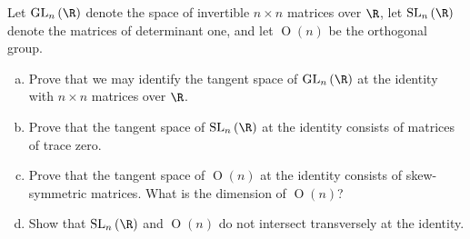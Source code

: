 \documentclass[10pt]{mypackage}
\begin{document}
\begin{problem}[Problem 2]
  Let $ \operatorname{GL}_n\left( \R \right) $ denote the space of invertible $n\times n$ matrices over $\R$, let $\operatorname{SL}_n\left( \R \right)$ denote the matrices of determinant one, and let $ \operatorname{O}\left( n \right) $ be the orthogonal group.
  \begin{enumerate}[(a)]
    \item Prove that we may identify the tangent space of $ \operatorname{GL}_n\left( \R \right) $ at the identity with $n\times n$ matrices over $\R$.
    \item Prove that the tangent space of $ \operatorname{SL}_n\left( \R \right) $ at the identity consists of matrices of trace zero.
    \item Prove that the tangent space of $ \operatorname{O}(n) $ at the identity consists of skew-symmetric matrices. What is the dimension of $ \operatorname{O}(n) $?
    \item Show that $ \operatorname{SL}_n\left( \R \right) $ and $ \operatorname{O}(n) $ do not intersect transversely at the identity.
  \end{enumerate}
\end{problem}
\end{document}
